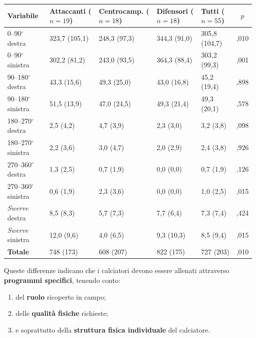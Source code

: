 \begin{table}[htbp]
  \centering
  \small
  \renewcommand{\arraystretch}{1.3}
  \begin{tabularx}{\textwidth}{|l|X|X|X|X|c|}
    \hline
    \textbf{Variabile} & \textbf{Attaccanti} \newline ($n=19$) & \textbf{Centrocamp.} \newline
      ($n=18$) & \textbf{Difensori} \newline ($n=18$) & \textbf{Tutti} \newline ($n=55$) &
      \textbf{$p$} \\
    \hline
    0--90$^\circ$ destra    & 323,7 (105,1) & 248,3 (97,3) & 344,3 (91,0) & 305,8 (104,7) & ,010 \\
    \hline
    0--90$^\circ$ sinistra  & 302,2 (81,2) & 243,0 (93,5) & 364,3 (88,4) & 303,2 (99,3) & ,001 \\
    \hline
    90--180$^\circ$ destra  & 43,3 (15,6) & 49,3 (25,0) & 43,0 (16,8) & 45,2 (19,4) & ,898 \\
    \hline
    90--180$^\circ$ sinistra & 51,5 (13,9) & 47,0 (24,5) & 49,3 (21,4) & 49,3 (20,1) & ,578 \\
    \hline
    180--270$^\circ$ destra & 2,5 (4,2) & 4,7 (3,9) & 2,3 (3,0) & 3,2 (3,8) & ,098 \\
    \hline
    180--270$^\circ$ sinistra & 2,2 (3,6) & 3,0 (4,7) & 2,0 (2,9) & 2,4 (3,8) & ,926 \\
    \hline
    270--360$^\circ$ destra & 1,3 (2,5) & 0,7 (1,9) & 0,0 (0,0) & 0,7 (1,9) & ,126 \\
    \hline
    270--360$^\circ$ sinistra & 0,6 (1,9) & 2,3 (3,6) & 0,0 (0,0) & 1,0 (2,5) & ,015 \\
    \hline
    \textit{Swerve} destra  & 8,5 (8,3) & 5,7 (7,3) & 7,7 (6,4) & 7,3 (7,4) & ,424 \\
    \hline
    \textit{Swerve} sinistra & 12,0 (9,6) & 4,0 (6,5) & 9,3 (10,3) & 8,5 (9,4) & ,015 \\
    \hline
    \textbf{Totale}         & 748 (173) & 608 (207) & 822 (175) & 727 (203) & ,010 \\
    \hline
  \end{tabularx}
\end{table}

Queste differenze indicano che i calciatori devono essere allenati attraverso \textbf{programmi
specifici}, tenendo conto:
\begin{enumerate}
  \item del \textbf{ruolo} ricoperto in campo;
  \item delle \textbf{qualità fisiche} richieste;
  \item e soprattutto della \textbf{struttura fisica individuale} del calciatore.
\end{enumerate}

